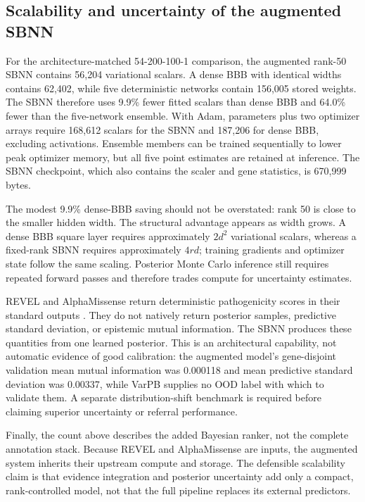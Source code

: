 \documentclass[11pt]{article}
\begin{document}
\subsection{Scalability and uncertainty of the augmented SBNN}

For the architecture-matched 54-200-100-1 comparison, the augmented rank-50 SBNN contains 56,204 variational scalars. A dense BBB with identical widths contains 62,402, while five deterministic networks contain 156,005 stored weights. The SBNN therefore uses 9.9\% fewer fitted scalars than dense BBB and 64.0\% fewer than the five-network ensemble. With Adam, parameters plus two optimizer arrays require 168,612 scalars for the SBNN and 187,206 for dense BBB, excluding activations. Ensemble members can be trained sequentially to lower peak optimizer memory, but all five point estimates are retained at inference. The SBNN checkpoint, which also contains the scaler and gene statistics, is 670,999 bytes.

The modest 9.9\% dense-BBB saving should not be overstated: rank 50 is close to the smaller hidden width. The structural advantage appears as width grows. A dense BBB square layer requires approximately $2d^2$ variational scalars, whereas a fixed-rank SBNN requires approximately $4rd$; training gradients and optimizer state follow the same scaling. Posterior Monte Carlo inference still requires repeated forward passes and therefore trades compute for uncertainty estimates.

REVEL and AlphaMissense return deterministic pathogenicity scores in their standard outputs \citep{revel2016,alphamissense2023}. They do not natively return posterior samples, predictive standard deviation, or epistemic mutual information. The SBNN produces these quantities from one learned posterior. This is an architectural capability, not automatic evidence of good calibration: the augmented model's gene-disjoint validation mean mutual information was 0.000118 and mean predictive standard deviation was 0.00337, while VarPB supplies no OOD label with which to validate them. A separate distribution-shift benchmark is required before claiming superior uncertainty or referral performance.

Finally, the count above describes the added Bayesian ranker, not the complete annotation stack. Because REVEL and AlphaMissense are inputs, the augmented system inherits their upstream compute and storage. The defensible scalability claim is that evidence integration and posterior uncertainty add only a compact, rank-controlled model, not that the full pipeline replaces its external predictors.
\end{document}
